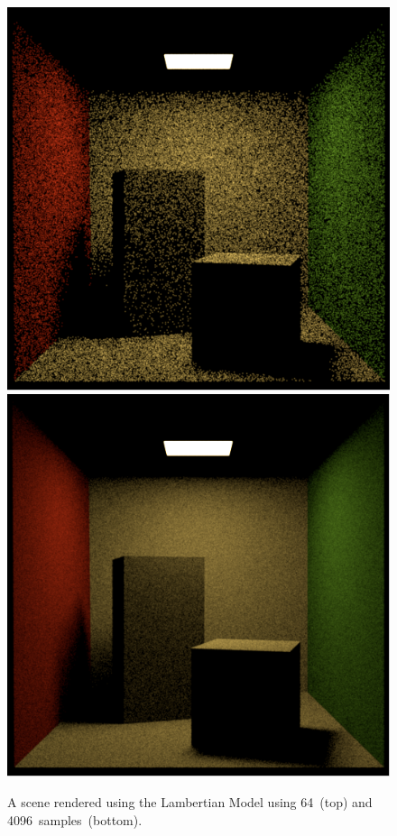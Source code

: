 \documentclass{article}
\begin{document}
\begin{figure}[p]
\centering
\includegraphics[width=.75\textwidth]{assets/lamb64}
\\
\includegraphics[width=.75\textwidth]{assets/lamb1024}

\caption{A scene rendered using the Lambertian Model using 64~(top) and 4096~samples~(bottom).}
\end{figure}
\end{document}
